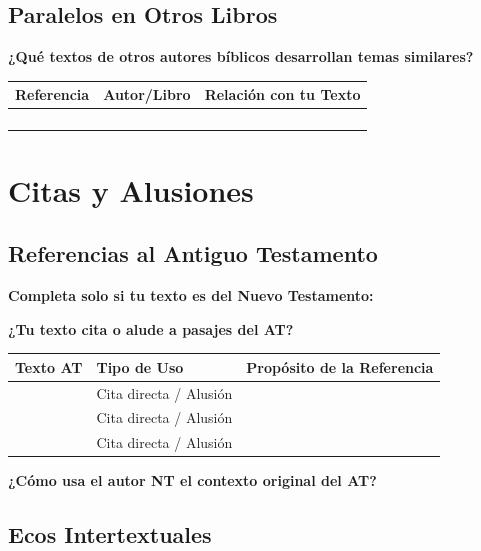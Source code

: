 \documentclass[11pt,a4paper]{article}
\begin{document}
\subsection{Paralelos en Otros Libros}

\textbf{¿Qué textos de otros autores bíblicos desarrollan temas similares?}

\begin{tabularx}{\textwidth}{|X|X|X|}
\hline
\textbf{Referencia} & \textbf{Autor/Libro} & \textbf{Relación con tu Texto} \\
\hline
& & \\[1.5cm]
\hline
& & \\[1.5cm]
\hline
& & \\[1.5cm]
\hline
& & \\[1.5cm]
\hline
\end{tabularx}

\section{Citas y Alusiones}

\subsection{Referencias al Antiguo Testamento}

\begin{contextbox}
\textbf{Completa solo si tu texto es del Nuevo Testamento:}
\end{contextbox}

\textbf{¿Tu texto cita o alude a pasajes del AT?}

\begin{tabularx}{\textwidth}{|X|X|X|}
\hline
\textbf{Texto AT} & \textbf{Tipo de Uso} & \textbf{Propósito de la Referencia} \\
\hline
& Cita directa / Alusión & \\[1cm]
\hline
& Cita directa / Alusión & \\[1cm]
\hline
& Cita directa / Alusión & \\[1cm]
\hline
\end{tabularx}

\textbf{¿Cómo usa el autor NT el contexto original del AT?}
\vspace{2cm}

\subsection{Ecos Intertextuales}
\end{document}
